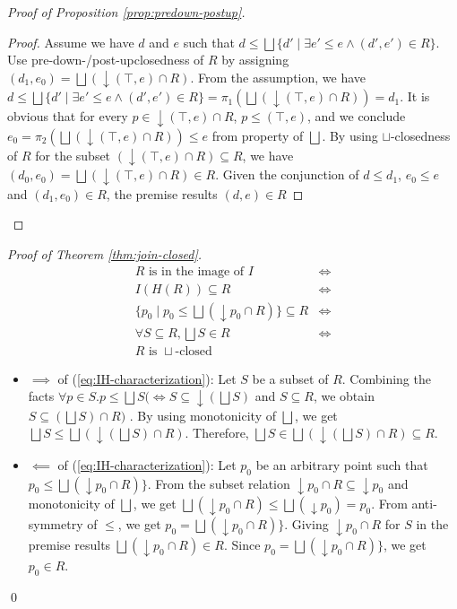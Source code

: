 \documentclass{llncs}
\newcommand{\join}{\sqcup}
\newcommand{\bigjoin}{\bigsqcup}
\begin{document}
\begin{proof}[Proof of Proposition \ref{prop:predown-postup}]
\begin{proposition}
    \begin{proof}
    Assume we have $d$ and $e$ such that $d \leq \bigjoin \{d' \mid \exists e' \leq e \land (d' , e') \in R \}$.
    Use pre-down-/post-upclosedness of $R$ by assigning $(d_{1}, e_{0}) = \bigjoin (\downarrow (\top , e) \cap R)$.
    From the assumption, we have $d \leq \bigjoin \{d' \mid \exists e' \leq e \land (d' , e') \in R \} = \pi_{1} (\bigjoin (\downarrow (\top , e) \cap R)) = d_{1} $.
    It is obvious that for every $p \in \downarrow (\top , e) \cap R$, $p \leq (\top , e)$, and we conclude $e_{0} = \pi_{2} (\bigjoin (\downarrow (\top , e) \cap R)) \leq e$ from property of $\bigjoin$.  By using $\join$-closedness of $R$ for the subset $(\downarrow (\top , e) \cap R) \subseteq R$, we have $(d_0 , e_0) = \bigjoin (\downarrow (\top , e) \cap R) \in R$.
    Given the conjunction of $d \leq d_{1}$, $e_{0} \leq e$ and $(d_{1} , e_{0}) \in R$, the premise results $(d, e) \in R$
    \end{proof}
  \end{proposition}
\end{proof}

\begin{proof}[Proof of Theorem \ref{thm:join-closed}]
   \begin{align*}
   R \text{ is in the image of } I &\iff \\
   I(H(R)) \subseteq R &\iff \\
   \{ p_{0} \mid p_{0} \leq \bigjoin (\downarrow p_{0} \cap R) \} \subseteq R &\iff \tag{\theequation}\label{eq:IH-characterization}\\
  \forall S \subseteq R, \bigjoin S \in R &\iff \\
  R \text{ is }\join \text{-closed }
  \end{align*}

  \begin{itemize}
  \item{$\implies$ of (\ref{eq:IH-characterization})}:
  Let $S$ be a subset of $R$. Combining the facts $\forall p \in S. p \leq \bigjoin S (\iff S \subseteq \downarrow (\bigjoin S)$ and $S \subseteq R$, we obtain $S \subseteq (\bigjoin S) \cap R)$ . By using monotonicity of $\bigjoin$, we get $\bigjoin S \leq \bigjoin (\downarrow (\bigjoin S) \cap R)$. Therefore, $\bigjoin S \in \bigjoin (\downarrow (\bigjoin S) \cap R) \subseteq R$.
  \item{$\impliedby$ of (\ref{eq:IH-characterization})}:
  Let $p_0$ be an arbitrary point such that $p_{0} \leq \bigjoin (\downarrow p_{0} \cap R) \}$.
  From the subset relation $\downarrow p_{0} \cap R \subseteq \downarrow p_{0}$ and monotonicity of $\bigjoin$, we get $\bigjoin (\downarrow p_{0} \cap R) \leq \bigjoin (\downarrow p_{0}) = p_{0}$. From anti-symmetry of $\leq$, we get $p_{0} = \bigjoin (\downarrow p_{0} \cap R) \}$.
  Giving $\downarrow p_{0} \cap R$ for $S$ in the premise results $\bigjoin (\downarrow p_{0} \cap R) \in R$. Since $p_{0} = \bigjoin (\downarrow p_{0} \cap R) \}$, we get $p_{0} \in R$.
  \end{itemize}
  \qed
\end{proof}
\end{document}
